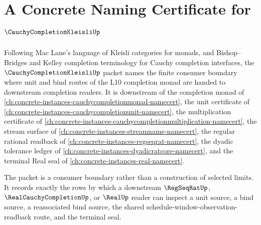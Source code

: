 \chapter{A Concrete Naming Certificate for $\CauchyCompletionKleisliUp$}
\label{ch:concrete-instances-cauchy-completion-kleisli-namecert}

Following Mac Lane's language of Kleisli categories for monads, and Bishop--Bridges and Kelley completion terminology for Cauchy completion interfaces, the $\CauchyCompletionKleisliUp$ packet names the finite consumer boundary where unit and bind routes of the L10 completion monad are handed to downstream completion readers. It is downstream of the completion monad of \autoref{ch:concrete-instances-cauchycompletionmonad-namecert}, the unit certificate of \autoref{ch:concrete-instances-cauchycompletionunit-namecert}, the multiplication certificate of \autoref{ch:concrete-instances-cauchycompletionmultiplication-namecert}, the stream surface of \autoref{ch:concrete-instances-streamname-namecert}, the regular rational readback of \autoref{ch:concrete-instances-regseqrat-namecert}, the dyadic tolerance ledger of \autoref{ch:concrete-instances-dyadicratcore-namecert}, and the terminal Real seal of \autoref{ch:concrete-instances-real-namecert}.

The packet is a consumer boundary rather than a construction of selected limits. It records exactly the rows by which a downstream $\RegSeqRatUp$, $\RealCauchyCompletionUp$, or $\RealUp$ reader can inspect a unit source, a bind source, a reassociated bind source, the shared schedule-window-observation-readback route, and the terminal seal.

